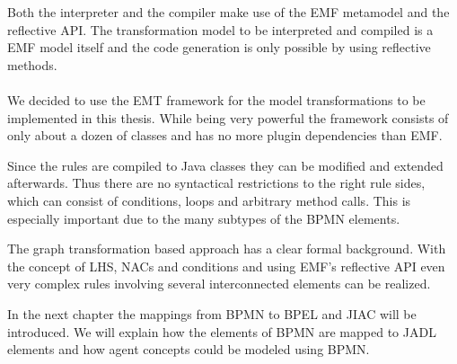 Both the interpreter and the compiler make use of the EMF metamodel and the reflective API. The transformation model to be interpreted and compiled is a EMF model itself and the code generation is only possible by using reflective methods.
\\
\\

We decided to use the EMT framework for the model transformations to be implemented in this thesis. While being very powerful the framework consists of only about a dozen of classes and has no more plugin dependencies than EMF.

Since the rules are compiled to Java classes they can be modified and extended afterwards. Thus there are no syntactical restrictions to the right rule sides, which can consist of conditions, loops and arbitrary method calls. This is especially important due to the many subtypes of the BPMN elements.

The graph transformation based approach has a clear formal background. With the concept of LHS, NACs and conditions and using EMF's reflective API even very complex rules involving several interconnected elements can be realized.

In the next chapter the mappings from BPMN to BPEL and JIAC will be introduced. We will explain how the elements of BPMN are mapped to JADL elements and how agent concepts could be modeled using BPMN.